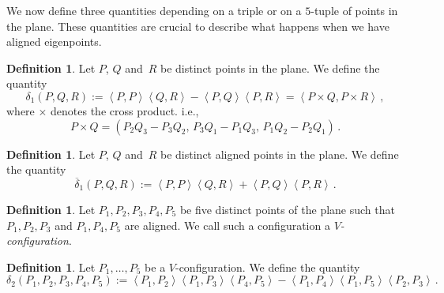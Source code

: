 \documentclass[11pt, a4paper, reqno, captions=tableheading,bibliography=totoc]{scrartcl}
\theoremstyle{plain}
\theoremstyle{definition}
\newtheorem{definition}[lemma]{Definition}
\newcommand{\scl}[2]{\left\langle {#1}, {#2} \right\rangle}
\begin{document}
We now define three quantities depending on a triple or on a $5$-tuple of points in the plane.
These quantities are crucial to describe what happens when we have aligned eigenpoints.

\begin{definition}
\label{definition:delta1}
 Let $P$, $Q$ and~$R$ be distinct points in the plane.
 We define the quantity
 \[
  \delta_1(P, Q, R) :=
  \scl{P}{P} \scl{Q}{R} - \scl{P}{Q}\scl{P}{R}
  =
  \scl{P\times Q}{P \times R} \,,
 \]
 where $\times$ denotes the cross product. i.e.,
 \[
  P \times Q = (P_2 Q_3 - P_3 Q_2, \, P_3 Q_1 - P_1 Q_3, \, P_1 Q_2 - P_2 Q_1) \,.
 \]

\end{definition}

\begin{definition}
\label{definition:delta1b}
 Let $P$, $Q$ and~$R$ be distinct aligned points in the plane.
 We define the quantity
 \[
  \overline{\delta}_1(P, Q, R) :=
  \scl{P}{P} \scl{Q}{R} + \scl{P}{Q}\scl{P}{R} \,.
  \]
\end{definition}

\begin{definition}
\label{Vconf}
Let $P_1, P_2, P_3, P_4, P_5$ be five distinct points of the plane
such that $P_1, P_2, P_3$ and $P_1, P_4, P_5$ are aligned.
We call such a configuration a \emph{$V$-configuration}.
\end{definition}


\begin{definition}
 Let $P_1, \dots, P_5$ be a $V$-configuration.
We define the quantity
 \[
  \delta_2(P_1, P_2, P_3, P_4, P_5) :=
  \scl{P_1}{P_2} \scl{P_1}{P_3} \scl{P_4}{P_5} -
  \scl{P_1}{P_4} \scl{P_1}{P_5} \scl{P_2}{P_3} \,.
 \]
\end{definition}
\end{document}
